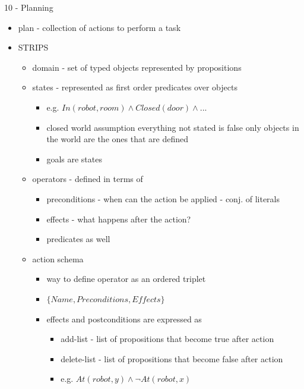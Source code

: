 \documentclass[11pt]{article}
\newcommand{\ee}[1]{\ensuremath{#1}}
\begin{document}
\begin{description}
\begin{itemize}
\begin{itemize}
\begin{enumerate}
\begin{itemize}
			\end{itemize}
	
		\end{enumerate}
	\end{itemize}
\end{itemize}

\item 10 - Planning
\begin{itemize}
	\item plan - collection of actions to perform a task
	\item STRIPS
	\begin{itemize}
		\item domain - set of typed objects represented by propositions
		
		\item states - represented as first order predicates over objects
		\begin{itemize}
			\item e.g. \ee{In(robot, room) \wedge Closed(door) \wedge ...}
			\item closed world assumption
			\subitem everything not stated is false
			\subitem only objects in the world are the ones that are defined
			\item goals are states
		\end{itemize}
	
		\item operators - defined in terms of
		\begin{itemize}
			\item preconditions - when can the action be applied - conj. of literals
			\item effects - what happens after the action?
			\item predicates as well
		\end{itemize}
	
		\item action schema
		\begin{itemize}
			\item way to define operator as an ordered triplet
			\item \ee{\{Name,Preconditions,Effects\}}
			\item effects and postconditions are expressed as
			\begin{itemize}
				\item add-list - list of propositions that become true after action
				\item delete-list - list of propositions that become false after action
				\item e.g. \ee{At(robot,y) \wedge \lnot At(robot,x)}
			\end{itemize}
		\end{itemize}
	

\end{itemize}
\end{itemize}
\end{description}
\end{document}
